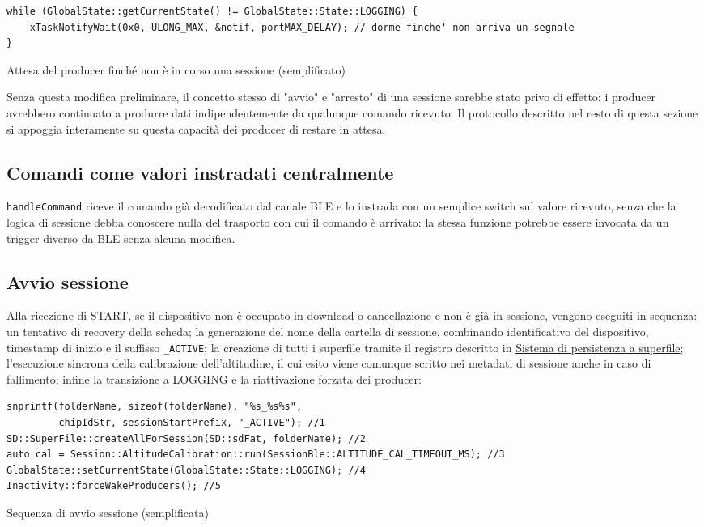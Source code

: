 \begin{listing}[H]
\begin{verbatim}
while (GlobalState::getCurrentState() != GlobalState::State::LOGGING) {
    xTaskNotifyWait(0x0, ULONG_MAX, &notif, portMAX_DELAY); // dorme finche' non arriva un segnale
}
\end{verbatim}
\caption{Attesa del producer finché non è in corso una sessione (semplificato)}
\label{listing:producer-dormant}
\end{listing}

Senza questa modifica preliminare, il concetto stesso di "avvio" e "arresto"
di una sessione sarebbe stato privo di effetto: i producer avrebbero
continuato a produrre dati indipendentemente da qualunque comando ricevuto.
Il protocollo descritto nel resto di questa sezione si appoggia interamente
su questa capacità dei producer di restare in attesa.

\subsection{Comandi come valori instradati centralmente}
\texttt{handleCommand} riceve il comando già decodificato dal canale BLE e lo
instrada con un semplice switch sul valore ricevuto, senza che la logica di
sessione debba conoscere nulla del trasporto con cui il comando è arrivato:
la stessa funzione potrebbe essere invocata da un trigger diverso da BLE
senza alcuna modifica.

\subsection{Avvio sessione}
Alla ricezione di START, se il dispositivo non è occupato in download o
cancellazione e non è già in sessione, vengono eseguiti in sequenza: un
tentativo di recovery della scheda; la generazione del nome della cartella di
sessione, combinando identificativo del dispositivo, timestamp di inizio e il
suffisso \texttt{\_ACTIVE}; la creazione di tutti i superfile tramite il
registro descritto in \hyperref[sec:impl-superfile]{Sistema di persistenza a
superfile}; l'esecuzione sincrona della calibrazione dell'altitudine, il cui
esito viene comunque scritto nei metadati di sessione anche in caso di
fallimento; infine la transizione a LOGGING e la riattivazione forzata dei
producer:

\begin{listing}[H]
\begin{verbatim}
snprintf(folderName, sizeof(folderName), "%s_%s%s",
         chipIdStr, sessionStartPrefix, "_ACTIVE"); //1
SD::SuperFile::createAllForSession(SD::sdFat, folderName); //2
auto cal = Session::AltitudeCalibration::run(SessionBle::ALTITUDE_CAL_TIMEOUT_MS); //3
GlobalState::setCurrentState(GlobalState::State::LOGGING); //4
Inactivity::forceWakeProducers(); //5
\end{verbatim}
\caption{Sequenza di avvio sessione (semplificata)}
\label{listing:session-start}
\end{listing}

